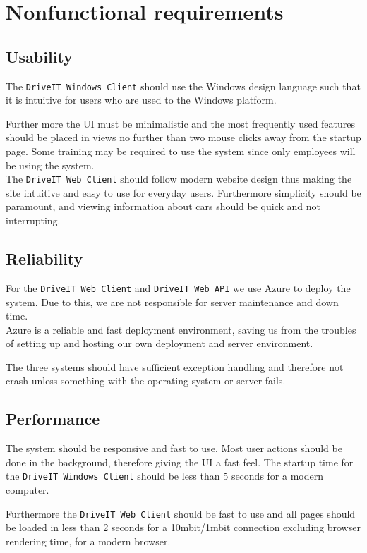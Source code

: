 \section{Nonfunctional requirements}
\subsection{Usability}
The \texttt{DriveIT Windows Client} should use the Windows design language such that it is intuitive for users who are used to the Windows platform.

Further more the UI must be minimalistic and the most frequently used features should be placed in views no further than two mouse clicks away from the startup page. Some training may be required to use the system since only employees will be using the system. \\

The \texttt{DriveIT Web Client} should follow modern website design thus making the site intuitive and easy to use for everyday users. Furthermore simplicity should be paramount, and viewing information about cars should be quick and not interrupting.

\subsection{Reliability}
For the \texttt{DriveIT Web Client} and \texttt{DriveIT Web API} we use Azure to deploy the system. Due to this, we are not responsible for server maintenance and down time. \\
Azure is a reliable and fast deployment environment, saving us from the troubles of setting up and hosting our own deployment and server environment.

The three systems should have sufficient exception handling and therefore not crash unless something with the operating system or server fails.

\subsection{Performance}
The system should be responsive and fast to use. Most user actions should be done in the background, therefore giving the UI a fast feel. The startup time for the \texttt{DriveIT Windows Client} should be less than 5 seconds for a modern computer.

Furthermore the \texttt{DriveIT Web Client} should be fast to use and all pages should be loaded in less than 2 seconds for a 10mbit/1mbit connection excluding browser rendering time, for a modern browser.

